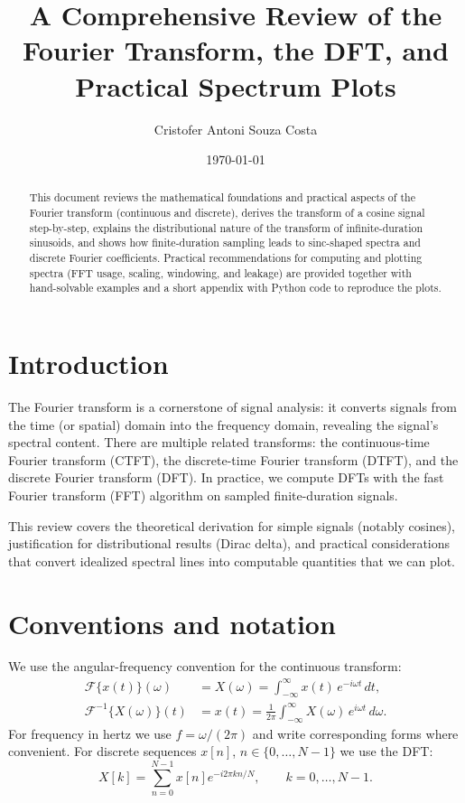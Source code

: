 \documentclass[a4paper]{article}
\title{A Comprehensive Review of the Fourier Transform, the DFT, and Practical Spectrum Plots}
\author{Cristofer Antoni Souza Costa}
\date{\today}
\begin{document}
\maketitle

\begin{abstract}
This document reviews the mathematical foundations and practical aspects of the Fourier transform (continuous and discrete), derives the transform of a cosine signal step-by-step, explains the distributional nature of the transform of infinite-duration sinusoids, and shows how finite-duration sampling leads to sinc-shaped spectra and discrete Fourier coefficients. Practical recommendations for computing and plotting spectra (FFT usage, scaling, windowing, and leakage) are provided together with hand-solvable examples and a short appendix with Python code to reproduce the plots.
\end{abstract}

\tableofcontents
\vspace{1em}

\section{Introduction}
The Fourier transform is a cornerstone of signal analysis: it converts signals from the time (or spatial) domain into the frequency domain, revealing the signal's spectral content. There are multiple related transforms: the continuous-time Fourier transform (CTFT), the discrete-time Fourier transform (DTFT), and the discrete Fourier transform (DFT). In practice, we compute DFTs with the fast Fourier transform (FFT) algorithm on sampled finite-duration signals.

This review covers the theoretical derivation for simple signals (notably cosines), justification for distributional results (Dirac delta), and practical considerations that convert idealized spectral lines into computable quantities that we can plot.

\section{Conventions and notation}
We use the angular-frequency convention for the continuous transform:
\begin{align}
\mathcal{F}\{x(t)\}(\omega) &= X(\omega)=\int_{-\infty}^{\infty} x(t)\,e^{-i\omega t}\,dt,\\
\mathcal{F}^{-1}\{X(\omega)\}(t) &= x(t)=\frac{1}{2\pi}\int_{-\infty}^{\infty} X(\omega)\,e^{i\omega t}\,d\omega.
\end{align}
For frequency in hertz we use $f=\omega/(2\pi)$ and write corresponding forms where convenient. For discrete sequences $x[n]$, $n\in\{0,\dots,N-1\}$ we use the DFT:
\begin{equation}
X[k]=\sum_{n=0}^{N-1} x[n] e^{-i2\pi k n /N},\qquad k=0,\dots,N-1.
\end{equation}
\end{document}
